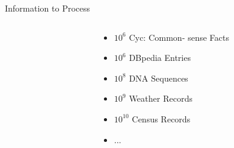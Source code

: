 \documentclass[12pt,landscape,english]{beamer}
\begin{document}
\begin{frame} {Information to Process}
\begin{columns}[T]
\begin{column}{0.5\textwidth}
\begin{itemize}
			\end{itemize}		
		\end{column}
		\begin{column}{0.5\textwidth}
			\centering{}
			\begin{itemize}
				\item $10^6$ {\small  Cyc: Common- sense Facts}
				\item $10^6$ DBpedia Entries
				\item $10^8$ DNA Sequences 
				\item $10^9$ Weather Records
				\item $10^{10}$ Census Records
				\item ...
			\end{itemize}		
		\end{column}
	\end{columns}
\end{frame}
\end{document}
